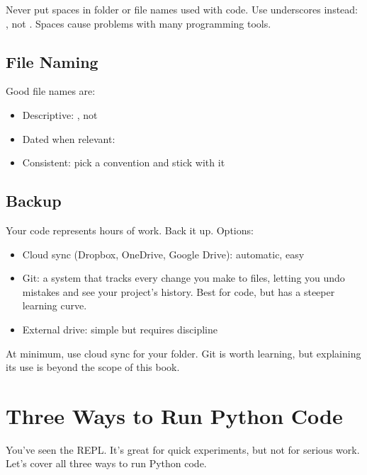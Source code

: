 \begin{warning}
Never put spaces in folder or file names used with code. Use underscores instead: , not . Spaces cause problems with many programming tools.
\end{warning}

\subsection{File Naming}

Good file names are:
\begin{itemize}
    \item Descriptive: , not 
    \item Dated when relevant: 
    \item Consistent: pick a convention and stick with it
\end{itemize}

\subsection{Backup}

Your code represents hours of work. Back it up. Options:

\begin{itemize}
    \item Cloud sync (Dropbox, OneDrive, Google Drive): automatic, easy
    \item Git: a system that tracks every change you make to files, letting you undo mistakes and see your project's history. Best for code, but has a steeper learning curve.
    \item External drive: simple but requires discipline
\end{itemize}

At minimum, use cloud sync for your  folder. Git is worth learning, but explaining its use is beyond the scope of this book.

\section{Three Ways to Run Python Code}
\label{sec:three-ways}

You've seen the REPL. It's great for quick experiments, but not for serious work. Let's cover all three ways to run Python code.

